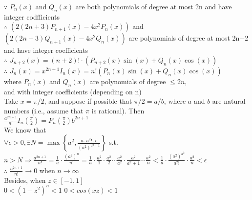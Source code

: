 \documentclass{article}
\begin{document}
$\because$ \qquad $P_n(x)$ and $Q_n(x)$ are both polynomials of degree at most 2n and have integer codfficients\\

$\therefore$ \qquad $(2(2n+3) P_{n+1}(x) - 4x^2P_n(x))$ and $(2(2n+3) Q_{n+1}(x) - 4x^2 Q_n(x))$ are polynomials  of degree at most 2n+2 and have integer coefficients\\

$\therefore$ \qquad $J_{n+2}(x) = (n+2)! \cdot (P_{n+2}(x) \sin{(x)} + Q_n(x) \cos{(x)})$\\

$\therefore$ \qquad $\displaystyle J_n(x) = x^{2n+1} I_n(x) = n! \left(P_n(x) \sin{(x)} + Q_n(x) \cos{(x)}\right)$\\

\hskip 1.1cm where $P_n(x)$ and $Q_n(x)$ are polynomials of degree $\leq 2n$,\\

\hskip 1.1cm and with integer coefficients (depending on n)\\

Take $x = \pi/2$, and suppose if possible that $\pi/2 = a/b$, where $a$ and $b$ are natural numbers (i.e., assume that $\pi$ is rational). Then\\

$\displaystyle \frac{a^{2n+1}}{n!} I_n\left(\frac{\pi}{2}\right) = P_n\left(\frac{\pi}{2}\right) b^{2n+1}$\\

We know that\\

$\forall \epsilon > 0, \exists N = \max \left\{a^2, \frac{a \cdot a^2! \cdot \epsilon}{(a^2)^{a^2+1}}\right\} $ s.t.\\

$\displaystyle n > N \Rightarrow \frac{a^{2n+1}}{n!} = \frac{1}{a} \cdot \frac{(a^2)^n}{n!} = \frac{1}{a} \cdot \frac{a^2}{1} \cdot \frac{a^2}{2} \cdots \frac{a^2}{a^2} \cdot \frac{a^2}{a^2 +1} \cdots \frac{a^2}{n} < \frac{1}{a} \cdot \frac{(a^2)^{a^2}}{a^2!} \cdot \frac{a^2}{n} < \epsilon$\\

$\therefore$ $\frac{a^{2n+1}}{n!} \rightarrow 0$ when $n \rightarrow \infty$\\

Besides, when $z \in [-1,1]$\\

$0 < (1-z^2)^n < 1$ \quad $0 < cos(xz) < 1$\\
\end{document}
